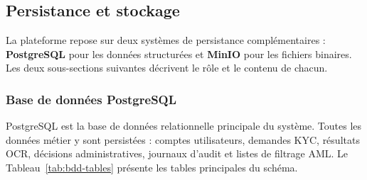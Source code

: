 \subsection{Persistance et stockage}
\label{subsec:persistance-stockage}

La plateforme repose sur deux systèmes de persistance complémentaires : \textbf{PostgreSQL} pour les données structurées et \textbf{MinIO} pour les fichiers binaires. Les deux sous-sections suivantes décrivent le rôle et le contenu de chacun.

\subsubsection{Base de données PostgreSQL}

PostgreSQL est la base de données relationnelle principale du système. Toutes les données métier y sont persistées : comptes utilisateurs, demandes KYC, résultats OCR, décisions administratives, journaux d'audit et listes de filtrage AML. Le Tableau~\ref{tab:bdd-tables} présente les tables principales du schéma.

